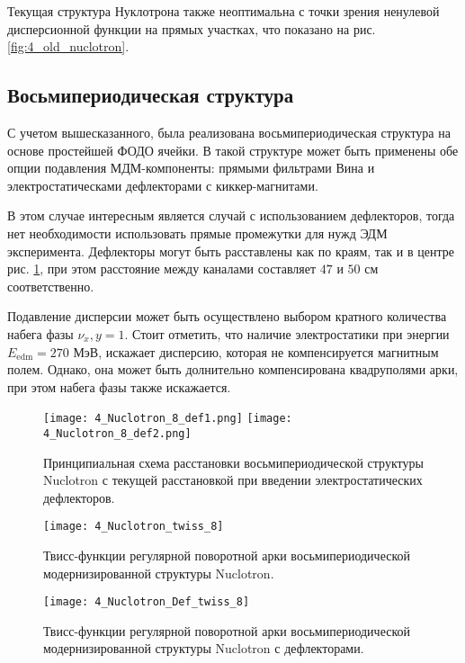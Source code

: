 \par Текущая структура Нуклотрона также неоптимальна с точки зрения ненулевой дисперсионной функции на прямых участках, что показано на рис. \ref{fig:4_old_nuclotron}.

	\subsection{Восьмипериодическая структура}\label{sec:EDM/optics/8period}

\par С учетом вышесказанного, была реализована восьмипериодическая структура на основе простейшей ФОДО ячейки. В такой структуре может быть применены обе опции подавления МДМ-компоненты: прямыми фильтрами Вина и электростатическами дефлекторами с киккер-магнитами.

\par В этом случае интересным является случай с использованием дефлекторов, тогда нет необходимости использовать прямые промежутки для нужд ЭДМ эксперимента. Дефлекторы могут быть расставлены как по краям, так и в центре рис. \ref{fig:4_Nuclotron_8}, при этом расстояние между каналами составляет $47$ и $50$ см соответственно.

\par Подавление дисперсии может быть осуществлено выбором кратного количества набега фазы $\nu_x,y = 1$. Стоит отметить, что наличие электростатики при энергии $E_{\textrm{edm}}=270$ МэВ, искажает дисперсию, которая не компенсируется магнитным полем. Однако, она может быть долнительно компенсирована квадруполями арки, при этом набега фазы также искажается.

\begin{figure}[!h]
  \centering
   \texttt{[image: 4\_Nuclotron\_8\_def1.png]}
   \texttt{[image: 4\_Nuclotron\_8\_def2.png]}
   \caption{Принципиальная схема расстановки восьмипериодической структуры Nuclotron с текущей расстановкой при введении электростатических дефлекторов.}
   \label{fig:4_Nuclotron_8}
\end{figure}

\begin{figure}[!h]
  \centering
   \texttt{[image: 4\_Nuclotron\_twiss\_8]}
   \caption{Твисс-функции регулярной поворотной арки восьмипериодической модернизированной структуры Nuclotron.}
   \label{fig:4_Nuclotron_twiss_8}
\end{figure}

\begin{figure}[!h]
  \centering
   \texttt{[image: 4\_Nuclotron\_Def\_twiss\_8]}
   \caption{Твисс-функции регулярной поворотной арки восьмипериодической модернизированной структуры Nuclotron с дефлекторами.}
   \label{fig:4_Nuclotron_Def_twiss_8}
\end{figure}

